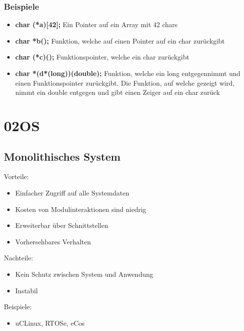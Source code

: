 \documentclass[a4paper]{scrreprt}
\begin{document}
\subsection{Beispiele}
\begin{itemize}
	\item \textbf{char (*a)[42];} Ein Pointer auf ein Array mit 42 chars
	\item \textbf{char *b();} Funktion, welche auf einen Pointer auf ein char zurückgibt
	\item \textbf{char (*c)();} Funktionspointer, welche ein char zurückgibt
	\item \textbf{char *(d*(long))(double);} Funktion, welche ein long entgegennimmt und einen Funktionspointer zurückgibt. Die Funktion, auf welche gezeigt wird, nimmt ein double entgegen und gibt einen Zeiger auf ein char zurück
\end{itemize}











\chapter{02OS}

\section{Monolithisches System}
Vorteile:
	\begin{itemize} 
		\item Einfacher Zugriff auf alle Systemdaten 
		\item Kosten von Modulinteraktionen sind niedrig
		\item Erweiterbar über Schnittstellen
		\item Vorhersehbares Verhalten 
	\end{itemize}
Nachteile:
	\begin{itemize}
		\item Kein Schutz zwischen System und Anwendung
		\item Instabil
	\end{itemize}

Beispiele:
	\begin{itemize}
		\item uCLinux, RTOSe, eCos
	\end{itemize}
	
\end{document}
